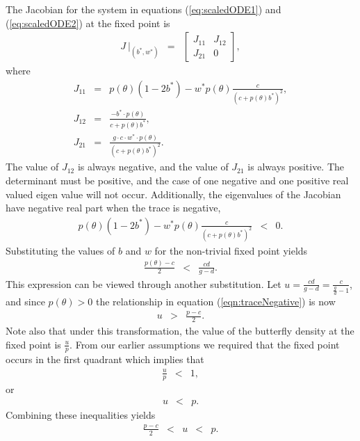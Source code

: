 \documentclass[review]{elsarticle}
\begin{document}
The Jacobian for the system in equations (\ref{eq:scaledODE1}) and
(\ref{eq:scaledODE2}) at the fixed point is
\begin{eqnarray}
  J ~ \bigg|_{(b^*,w^*)} & = &
          \left[
          \begin{array}{rr}
            J_{11} & J_{12} \\
            J_{21} & 0
          \end{array}
          \right],
\end{eqnarray}
where
\begin{eqnarray}
  \label{eq:jacobian}
  J_{11} & = & p(\theta)(1-2b^*) - w^* p(\theta)\frac{c}{(c+p(\theta)b^*)^2}, \\
  J_{12} & = & \frac{-b^*\cdot p(\theta)}{c+p(\theta)b^*}, \\
  J_{21} & = & \frac{g\cdot c \cdot w^* \cdot p(\theta)}{(c+p(\theta)b^*)^2}.
\end{eqnarray}
The value of $J_{12}$ is always negative, and the value of $J_{21}$ is always positive. The determinant must be positive, and the case of one negative and one positive real valued eigen value will not occur.
Additionally, the eigenvalues of the Jacobian have negative real part when the
trace is negative,
\begin{eqnarray}
  p(\theta)(1-2b^*) - w^* p(\theta)\frac{c}{(c+p(\theta)b^*)^2} & < & 0.
\end{eqnarray}
Substituting the values of $b$ and $w$ for the non-trivial fixed point
yields
\begin{eqnarray}
  \label{eqn:traceNegative}
  \frac{p(\theta)-c}{2} & < & \frac{cd}{g-d}.
\end{eqnarray}
This expression can be viewed through another substitution. Let
$u=\frac{cd}{g-d}=\frac{c}{\frac{g}{d}-1}$, and since
$p(\theta)>0$ the relationship in equation
(\ref{eqn:traceNegative}) is now
\begin{eqnarray}
  \label{eq:stabilityParameters}
  u & > & \frac{p-c}{2}.
\end{eqnarray}
Note also that under this transformation, the value of the butterfly
density at the fixed point is $\frac{u}{p}$. From our earlier assumptions we required that the fixed point occurs in the first quadrant which implies that
\begin{eqnarray}
  \frac{u}{p} & < & 1,
\end{eqnarray}
or 
\begin{eqnarray}
  \label{eq:boundFixedPoint}
  u & < & p.
\end{eqnarray}
Combining these inequalities yields
\begin{equation}
  \begin{array}{rcccl}
  \frac{p-c}{2}  & <  & u  & < & p.
  \end{array}
\end{equation}
\end{document}
